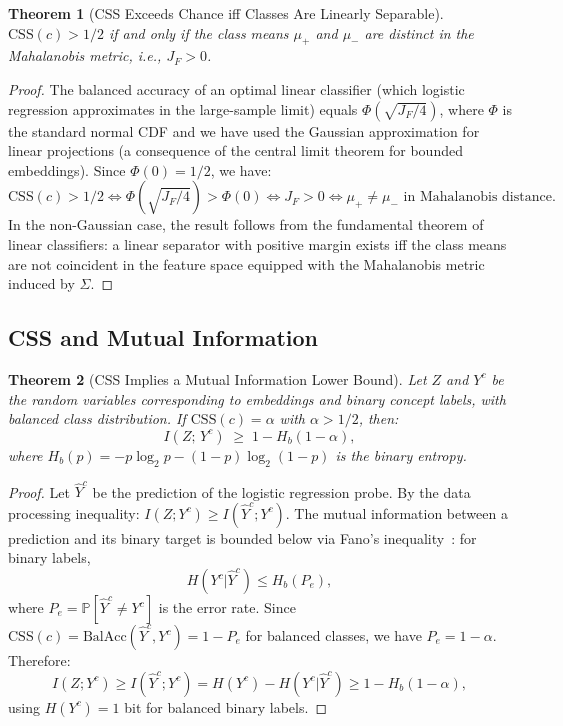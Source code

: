\documentclass[12pt]{article}
\newtheorem{theorem}{Theorem}[section]
\theoremstyle{definition}
\theoremstyle{remark}
\newcommand{\Prob}{\mathbb{P}}
\newcommand{\css}{\mathrm{CSS}}
\newcommand{\BalAcc}{\mathrm{BalAcc}}
\newcommand{\Hb}{H_b}
\begin{document}
\begin{theorem}[CSS Exceeds Chance iff Classes Are Linearly Separable]
\label{thm:css_fisher}
$\css(c) > 1/2$ if and only if the class means $\mu_+$ and $\mu_-$ are
distinct in the Mahalanobis metric, i.e., $J_F > 0$.
\end{theorem}

\begin{proof}
The balanced accuracy of an optimal linear classifier (which logistic
regression approximates in the large-sample limit) equals $\Phi(\sqrt{J_F/4})$,
where $\Phi$ is the standard normal CDF and we have used the Gaussian
approximation for linear projections (a consequence of the central limit
theorem for bounded embeddings). Since $\Phi(0) = 1/2$, we have:
\[
  \css(c) > 1/2 \iff \Phi(\sqrt{J_F/4}) > \Phi(0) \iff J_F > 0 \iff \mu_+ \neq \mu_-
  \text{ in Mahalanobis distance.}
\]
In the non-Gaussian case, the result follows from the fundamental theorem
of linear classifiers: a linear separator with positive margin exists iff
the class means are not coincident in the feature space equipped with the
Mahalanobis metric induced by $\Sigma$.
\end{proof}

\subsection{CSS and Mutual Information}

\begin{theorem}[CSS Implies a Mutual Information Lower Bound]
\label{thm:css_mi}
Let $Z$ and $Y^c$ be the random variables corresponding to embeddings and
binary concept labels, with balanced class distribution. If $\css(c) = \alpha$
with $\alpha > 1/2$, then:
\[
  I(Z;\, Y^c) \;\geq\; 1 - \Hb(1 - \alpha),
\]
where $\Hb(p) = -p\log_2 p - (1-p)\log_2(1-p)$ is the binary entropy.
\end{theorem}

\begin{proof}
Let $\hat{Y}^c$ be the prediction of the logistic regression probe. By the
data processing inequality:
$I(Z; Y^c) \geq I(\hat{Y}^c; Y^c)$.
The mutual information between a prediction and its binary target is bounded
below via Fano's inequality~\citep{cover2006information}: for binary labels,
\[
  H(Y^c | \hat{Y}^c) \leq \Hb(P_e),
\]
where $P_e = \Prob[\hat{Y}^c \neq Y^c]$ is the error rate. Since
$\css(c) = \BalAcc(\hat{Y}^c, Y^c) = 1 - P_e$ for balanced classes, we have
$P_e = 1 - \alpha$. Therefore:
\[
  I(Z; Y^c) \geq I(\hat{Y}^c; Y^c) = H(Y^c) - H(Y^c | \hat{Y}^c)
  \geq 1 - \Hb(1 - \alpha),
\]
using $H(Y^c) = 1$ bit for balanced binary labels.
\end{proof}
\end{document}
